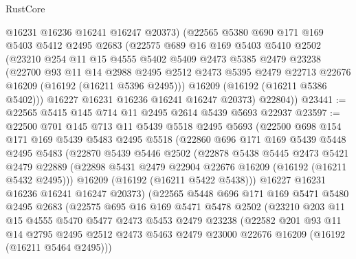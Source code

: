 \begin{lexlean}{RustCore}
\begin{coremodule}
        @16231
        @16236
        @16241
        @16247
        @20373)
      (@22565
        @5380
        @690
        @171
        @169
        @5403
        @5412
        @2495
        @2683
        (@22575
          @689
          @16
          @169
          @5403
          @5410
          @2502
          (@23210
            @254
            @11
            @15
            @4555
            @5402
            @5409
            @2473
            @5385
            @2479
            @23238
            (@22700
              @93
              @11
              @14
              @2988
              @2495
              @2512
              @2473
              @5395
              @2479
              @22713
              @22676
              @16209
              (@16192 (@16211 @5396 @2495)))
            @16209
            (@16192 (@16211 @5386 @5402)))
          @16227
          @16231
          @16236
          @16241
          @16247
          @20373)
        @22804))
@23441 := @22565 @5415 @145 @714 @11 @2495 @2614 @5439 @5693 @22937
@23597 := @22500
    @701
    @145
    @713
    @11
    @5439
    @5518
    @2495
    @5693
    (@22500
      @698
      @154
      @171
      @169
      @5439
      @5483
      @2495
      @5518
      (@22860
        @696
        @171
        @169
        @5439
        @5448
        @2495
        @5483
        (@22870
          @5439
          @5446
          @2502
          (@22878
            @5438
            @5445
            @2473
            @5421
            @2479
            @22889
            (@22898 @5431 @2479 @22904 @22676 @16209 (@16192 (@16211 @5432 @2495)))
            @16209
            (@16192 (@16211 @5422 @5438)))
          @16227
          @16231
          @16236
          @16241
          @16247
          @20373)
        (@22565
          @5448
          @696
          @171
          @169
          @5471
          @5480
          @2495
          @2683
          (@22575
            @695
            @16
            @169
            @5471
            @5478
            @2502
            (@23210
              @203
              @11
              @15
              @4555
              @5470
              @5477
              @2473
              @5453
              @2479
              @23238
              (@22582
                @201
                @93
                @11
                @14
                @2795
                @2495
                @2512
                @2473
                @5463
                @2479
                @23000
                @22676
                @16209
                (@16192 (@16211 @5464 @2495)))

\end{coremodule}
\end{lexlean}
